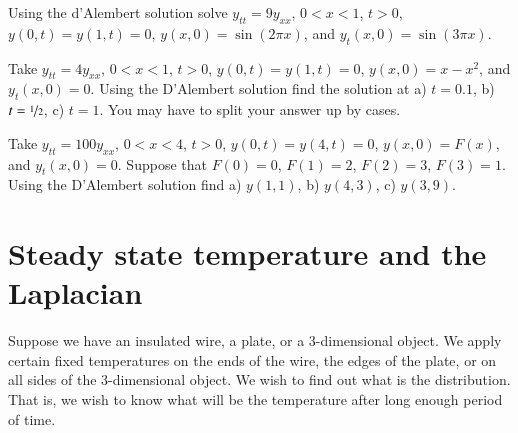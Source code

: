 \documentclass[12pt]{book}
\begin{document}
\setcounter{exercise}{100}

\begin{exercise}
Using the d'Alembert solution solve $y_{tt} = 9y_{xx}$, $0 < x < 1$, $t >
0$,
$y(0,t) = y(1, t) = 0$, $y(x,0) = \sin (2 \pi x)$, and
$y_t(x,0) = \sin (3 \pi x)$.
\end{exercise}

\begin{exercise}
Take $y_{tt} = 4y_{xx}$, $0 < x < 1$, $t > 0$,
$y(0,t) = y(1, t) = 0$, $y(x,0) = x-x^2$, and
$y_t(x,0) = 0$.  Using the D'Alembert solution find
the solution at a) $t=0.1$,
b) $t=\nicefrac{1}{2}$, c) $t=1$.  You may have to split your answer up
by cases.
\end{exercise}

\begin{exercise}
Take $y_{tt} = 100y_{xx}$, $0 < x < 4$, $t > 0$,
$y(0,t) = y(4, t) = 0$, $y(x,0) = F(x)$, and
$y_t(x,0) = 0$.  Suppose that
$F(0)=0$,
$F(1)=2$,
$F(2)=3$,
$F(3)=1$.
Using the D'Alembert solution find
a) $y(1,1)$,
b) $y(4,3)$,
c) $y(3,9)$.
\end{exercise}


\sectionnewpage
\section{Steady state temperature and the Laplacian}
\label{dirich:section}


Suppose we have an insulated wire, a plate, or a 3-dimensional object.
We apply
certain fixed temperatures on the ends of the wire, the edges of the plate,
or on all sides of the 3-dimensional object.  We wish to find out what is the
\emph{} distribution.  That is, we wish to know what will
be the temperature after long enough period of time.
\end{document}
